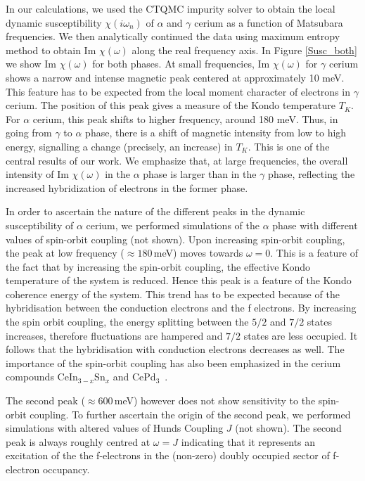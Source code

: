 \documentclass[10pt]{ruthesis}
\begin{document}
{In our calculations, we used the CTQMC impurity solver to obtain the
local dynamic  susceptibility $\chi(i\omega_n)$ of $\alpha$ and
$\gamma$ cerium as a function of Matsubara frequencies.  We then
analytically continued the data using maximum entropy method to obtain
Im $\chi (\omega)$ along the real frequency axis.  In Figure
\ref{Susc_both} we show Im $\chi(\omega)$ for both phases.  At small
frequencies, Im $\chi (\omega)$ for $\gamma$ cerium shows a narrow and
intense magnetic peak centered at approximately 10 meV. This feature
has to be expected from the local moment character of electrons in
$\gamma$ cerium.  The position of this peak gives a measure of the
Kondo temperature $T_K$.  For $\alpha$ cerium, this peak shifts to
higher frequency, around 180 meV.  Thus, in going from
$\gamma$ to $\alpha$ phase, there is a shift of magnetic intensity
from low to high energy, signalling a change (precisely, an increase)
in $T_K$.  This is one of the central results of our work.  We
emphasize that, at large frequencies, the overall intensity of Im
$\chi (\omega)$ in the $\alpha$ phase is larger than in the $\gamma$
phase, reflecting the increased hybridization of electrons in the
former phase.


In order to ascertain the nature of the different peaks in the dynamic
susceptibility of $\alpha$ cerium, we performed simulations of the
$\alpha$ phase with different values of spin-orbit coupling (not
shown).  Upon increasing spin-orbit coupling, the peak at low frequency
($\approx 180\,$meV) moves towards $\omega=0$.  This is a feature of
the fact that by increasing the spin-orbit coupling, the effective
Kondo temperature of the system is reduced.  Hence this peak is a
feature of the Kondo coherence energy of the system.  This trend has to
be expected because of the hybridisation between the conduction
electrons and the f electrons. By increasing the spin orbit coupling,
the energy splitting between the $5/2$ and $7/2$ states increases,
therefore fluctuations are hampered and $7/2$ states are less
occupied. It follows that the hybridisation with conduction electrons
decreases as well.  The importance of the spin-orbit coupling has also
been emphasized in the cerium compounds CeIn$_{3-x}$Sn$_x$ and
CePd$_3$~\cite{muraniSO, muraniCePd3, cox1987}.

The second peak ($\approx 600\,$meV) however does not show sensitivity
to the spin-orbit coupling.  To further ascertain the origin of the
second peak, we performed simulations with altered values of Hunds
Coupling $J$ (not shown).  The second peak is always roughly centred
at $\omega=J$ indicating that it represents an excitation of the the
f-electrons in the (non-zero) doubly occupied sector of f-electron
occupancy.

}
\end{document}
